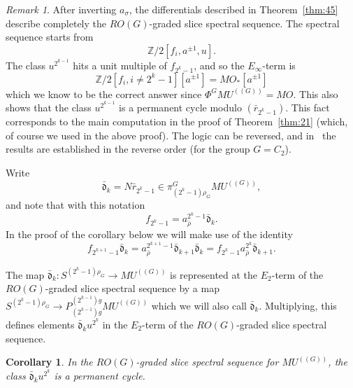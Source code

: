 \documentclass{amsart}
\newtheorem{cor}[equation]{Corollary}
\newtheorem{rem}[equation]{Remark}
\theoremstyle{definition}
\theoremstyle{remark}
\newtheorem{rem}[equation]{Remark}
\newcommand{\Z}{{\mathbb Z}}
\newcommand{\mutn}[1]{MU^{(\!(#1)\!)}}
\newcommand{\slc}[2]{P_{#1}^{#1}#2}
\newcommand{\gfp}[1]{\Phi^{#1}}
\newcommand{\phig}{\gfp{G}}
\newcommand{\gbar}{\bar}
\newcommand{\normrbar}{\gbar{\mathfrak d}}
\newcommand{\rr}{\gbar{r}}
\begin{document}
\begin{rem}
\label{rem:3}
After inverting $a_{\sigma}$, the differentials
described in Theorem~\ref{thm:45} describe completely the
$RO(G)$-graded slice spectral sequence.  The spectral sequence starts
from
\[
\Z/2[f_{i}, a^{\pm1}, u].
\]
The class $u^{2^{k-1}}$ hits a unit multiple of $f_{2^{k}-1}$, and so
the $E_{\infty}$-term is
\[
\Z/2[f_{i},i\ne 2^{k}-1][a^{\pm1}]=MO_{\ast}[a^{\pm1}]
\]
which we know to be the correct answer since $\phig \mutn{G}=MO$.
This also shows that the class $u^{2^{k-1}}$ is a
permanent cycle modulo $(\rr_{2^{k}-1})$.  This fact corresponds to
the main computation in the proof of Theorem~\ref{thm:21} (which, of
course we used in the above proof).  The logic can be reversed, and
in~\cite{MR1808224} the results are established in the reverse order
(for the group $G=C_{2}$).
\end{rem}

Write
\[
\normrbar_{k} = N \rr_{2^{k}-1} \in
\pi^{G}_{(2^{k}-1)\rho_{G}}\mutn{G},
\]
and note that with this notation
\[
f_{2^{k}-1}= a_{\bar{\rho}}^{2^{k}-1}\normrbar_{k}.
\]
In the proof of the corollary below we will make use of the identity
\begin{equation}
\label{eq:116}
f_{2^{k+1}-1}\normrbar_{k}
=a_{\bar{\rho}}^{2^{k+1}-1}\normrbar_{k+1}\normrbar_{k}
= f_{2^{k}-1} a_{\bar{\rho}}^{2^{k}} \normrbar_{k+1}.
\end{equation}

The map $\normrbar_{k}:S^{(2^{k}-1)\rho_{G}}\to\mutn{G}$ is
represented at the $E_{2}$-term of the $RO(G)$-graded slice spectral
sequence by a map $S^{(2^{k}-1)\rho_{G}}\to\slc{(2^{k-1})g}{\mutn{G}}$
which we will also call $\normrbar_{k}$.  Multiplying, this defines
elements $\normrbar_{k}u^{2^{k}}$ in the $E_{2}$-term of the
$RO(G)$-graded slice spectral sequence.
\begin{cor}
\label{thm:50}
In the $RO(G)$-graded slice spectral sequence for
$\mutn{G}$, the class $\normrbar_{k}u^{2^{k}}$
is a permanent cycle.
\end{cor}
\end{document}
